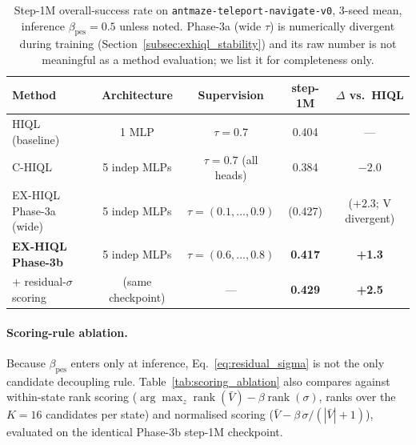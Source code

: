\documentclass[11pt]{article}
\begin{document}
\begin{table}[h]
  \centering
  \caption{Step-1M overall-success rate on
           \texttt{antmaze-teleport-navigate-v0}, 3-seed mean, inference
           $\beta_\text{pes}=0.5$ unless noted.
           Phase-3a (wide $\tau$) is numerically divergent during training
           (Section~\ref{subsec:exhiql_stability}) and its raw number is
           not meaningful as a method evaluation; we list it for
           completeness only.}
  \label{tab:main_results}
  \small
  \begin{tabular}{lcccc}
    \toprule
    Method & Architecture & Supervision & step-1M & $\Delta$ vs.\ HIQL \\
    \midrule
    HIQL (baseline)          & 1 MLP          & $\tau=0.7$              & 0.404 & ---     \\
    C-HIQL                   & 5 indep MLPs   & $\tau=0.7$ (all heads)  & 0.384 & $-2.0$  \\
    EX-HIQL Phase-3a (wide)  & 5 indep MLPs   & $\tau=(0.1,\ldots,0.9)$ & (0.427) & ($+2.3$; V divergent) \\
    \textbf{EX-HIQL Phase-3b}
                             & 5 indep MLPs   & $\tau=(0.6,\ldots,0.8)$ & \textbf{0.417} & \textbf{+1.3} \\
    \quad + residual-$\sigma$ scoring
                             & (same checkpoint) & ---                   & \textbf{0.429} & \textbf{+2.5} \\
    \bottomrule
  \end{tabular}
\end{table}

\paragraph{Scoring-rule ablation.}
Because $\beta_\text{pes}$ enters only at inference,
Eq.~\eqref{eq:residual_sigma} is not the only candidate decoupling rule.
Table~\ref{tab:scoring_ablation} also compares against within-state rank
scoring
($\arg\max_z \operatorname{rank}(\bar V) - \beta \operatorname{rank}(\sigma)$,
ranks over the $K = 16$ candidates per state) and normalised scoring
($\bar V - \beta\,\sigma/(|\bar V|+1)$), evaluated on the identical
Phase-3b step-1M checkpoint.
\end{document}
